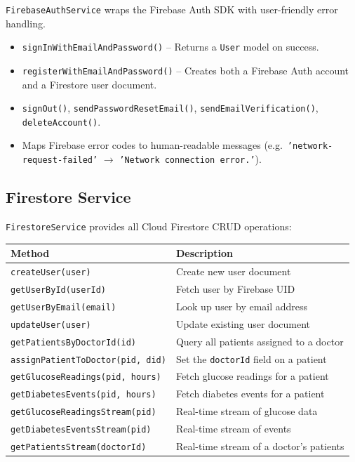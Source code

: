 \documentclass[12pt,a4paper]{article}
\begin{document}
\texttt{FirebaseAuthService} wraps the Firebase Auth SDK with user-friendly error handling.

\begin{itemize}
    \item \texttt{signInWithEmailAndPassword()} -- Returns a \texttt{User} model on success.
    \item \texttt{registerWithEmailAndPassword()} -- Creates both a Firebase Auth account and a Firestore user document.
    \item \texttt{signOut()}, \texttt{sendPasswordResetEmail()}, \texttt{sendEmailVerification()}, \texttt{deleteAccount()}.
    \item Maps Firebase error codes to human-readable messages (e.g.\ \texttt{'network-request-failed'} $\rightarrow$ \texttt{'Network connection error.'}).
\end{itemize}

\subsection{Firestore Service}

\texttt{FirestoreService} provides all Cloud Firestore CRUD operations:

\begin{longtable}{p{5.5cm} p{9cm}}
\toprule
\textbf{Method} & \textbf{Description} \\
\midrule
\endhead
\texttt{createUser(user)} & Create new user document \\
\texttt{getUserById(userId)} & Fetch user by Firebase UID \\
\texttt{getUserByEmail(email)} & Look up user by email address \\
\texttt{updateUser(user)} & Update existing user document \\
\texttt{getPatientsByDoctorId(id)} & Query all patients assigned to a doctor \\
\texttt{assignPatientToDoctor(pid, did)} & Set the \texttt{doctorId} field on a patient \\
\texttt{getGlucoseReadings(pid, hours)} & Fetch glucose readings for a patient \\
\texttt{getDiabetesEvents(pid, hours)} & Fetch diabetes events for a patient \\
\texttt{getGlucoseReadingsStream(pid)} & Real-time stream of glucose data \\
\texttt{getDiabetesEventsStream(pid)} & Real-time stream of events \\
\texttt{getPatientsStream(doctorId)} & Real-time stream of a doctor's patients \\
\bottomrule
\end{longtable}
\end{document}
